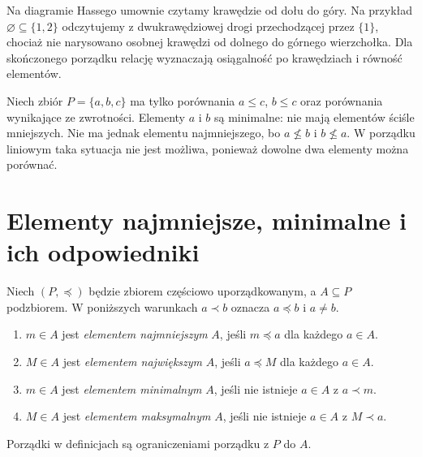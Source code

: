 \begin{uwaga}
Na diagramie Hassego umownie czytamy krawędzie od dołu do góry.
Na przykład $\varnothing\subseteq\{1,2\}$ odczytujemy
z dwukrawędziowej drogi przechodzącej przez $\{1\}$,
chociaż nie narysowano osobnej krawędzi od dolnego do górnego
wierzchołka. Dla skończonego porządku relację wyznaczają
osiągalność po krawędziach i równość elementów.
\end{uwaga}


\begin{przyklad}
Niech zbiór $P=\{a,b,c\}$ ma tylko porównania
$a\le c$, $b\le c$ oraz porównania wynikające ze zwrotności.
Elementy $a$ i $b$ są minimalne: nie mają elementów ściśle mniejszych.
Nie ma jednak elementu najmniejszego, bo $a\not\le b$ i $b\not\le a$.
W porządku liniowym taka sytuacja nie jest możliwa, ponieważ
dowolne dwa elementy można porównać.
\end{przyklad}

\section{Elementy najmniejsze, minimalne i ich odpowiedniki}
\label{sec:order-minmax}
\begin{definicja}
\label{def:order-extrema}
Niech $(P,\preceq)$ będzie zbiorem częściowo uporządkowanym,
a $A\subseteq P$ podzbiorem. W poniższych warunkach
$a\prec b$ oznacza $a\preceq b$ i $a\ne b$.
\begin{enumerate}[label=(\roman*)]
\item $m\in A$ jest \emph{elementem najmniejszym} $A$,
jeśli $m\preceq a$ dla każdego $a\in A$.
\item $M\in A$ jest \emph{elementem największym} $A$,
jeśli $a\preceq M$ dla każdego $a\in A$.
\item $m\in A$ jest \emph{elementem minimalnym} $A$,
jeśli nie istnieje $a\in A$ z $a\prec m$.
\item $M\in A$ jest \emph{elementem maksymalnym} $A$,
jeśli nie istnieje $a\in A$ z $M\prec a$.
\end{enumerate}
Porządki w definicjach są ograniczeniami porządku z $P$ do $A$.
\end{definicja}

